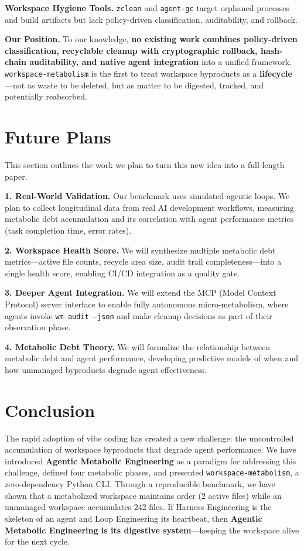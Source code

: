 \documentclass[sigconf,anonymous]{acmart}
\begin{document}
\textbf{Workspace Hygiene Tools.} \texttt{zclean} \cite{zclean2026} and \texttt{agent-gc} \cite{jeong2026agentgc} target orphaned processes and build artifacts but lack policy-driven classification, auditability, and rollback.

\textbf{Our Position.} To our knowledge, \textbf{no existing work combines policy-driven classification, recyclable cleanup with cryptographic rollback, hash-chain auditability, and native agent integration} into a unified framework. \texttt{workspace-metabolism} is the first to treat workspace byproducts as a \textbf{lifecycle}---not as waste to be deleted, but as matter to be digested, tracked, and potentially reabsorbed.

\section{Future Plans}
This section outlines the work we plan to turn this new idea into a full-length paper.

\textbf{1. Real-World Validation.} Our benchmark uses simulated agentic loops. We plan to collect longitudinal data from real AI development workflows, measuring metabolic debt accumulation and its correlation with agent performance metrics (task completion time, error rates).

\textbf{2. Workspace Health Score.} We will synthesize multiple metabolic debt metrics---active file counts, recycle area size, audit trail completeness---into a single health score, enabling CI/CD integration as a quality gate.

\textbf{3. Deeper Agent Integration.} We will extend the MCP (Model Context Protocol) server interface to enable fully autonomous micro-metabolism, where agents invoke \texttt{wm audit --json} and make cleanup decisions as part of their observation phase.

\textbf{4. Metabolic Debt Theory.} We will formalize the relationship between metabolic debt and agent performance, developing predictive models of when and how unmanaged byproducts degrade agent effectiveness.

\section{Conclusion}
The rapid adoption of vibe coding has created a new challenge: the uncontrolled accumulation of workspace byproducts that degrade agent performance. We have introduced \textbf{Agentic Metabolic Engineering} as a paradigm for addressing this challenge, defined four metabolic phases, and presented \texttt{workspace-metabolism}, a zero-dependency Python CLI. Through a reproducible benchmark, we have shown that a metabolized workspace maintains order (2 active files) while an unmanaged workspace accumulates 242 files. If Harness Engineering is the skeleton of an agent and Loop Engineering its heartbeat, then \textbf{Agentic Metabolic Engineering is its digestive system}---keeping the workspace alive for the next cycle.




\end{document}
